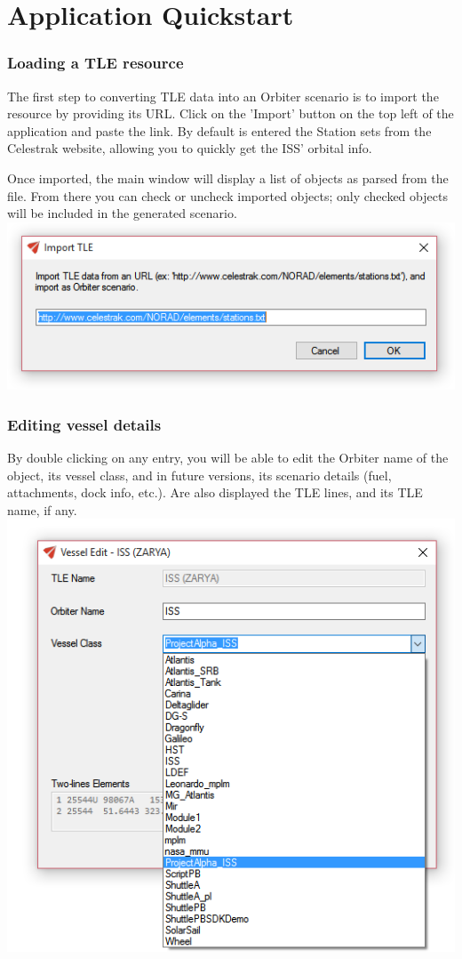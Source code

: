 \documentclass[a4paper]{article}
\begin{document}
	\newpage
	\part{Application Quickstart}
		\section{Loading a TLE resource}
			The first step to converting TLE data into an Orbiter scenario is to import the resource by providing its URL. Click on the 'Import' button on the top left of the application and paste the link. By default is entered the Station sets from the Celestrak website, allowing you to quickly get the ISS' orbital info.
			
			Once imported, the main window will display a list of objects as parsed from the file. From there you can check or uncheck imported objects; only checked objects will be included in the generated scenario.\\
			\includegraphics[scale=1]{import_tle.png}
			
		\section{Editing vessel details}
			By double clicking on any entry, you will be able to edit the Orbiter name of the object, its vessel class, and in future versions, its scenario details (fuel, attachments, dock info, etc.). Are also displayed the TLE lines, and its TLE name, if any.\\
			\includegraphics[scale=1]{vessel_edit.png}
			
\end{document}
